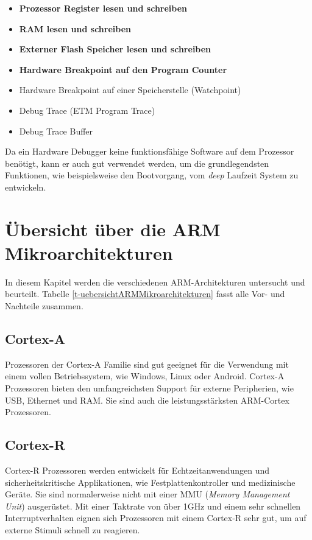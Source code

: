 \begin{itemize}
	\item \textbf{Prozessor Register lesen und schreiben}
	\item \textbf{RAM lesen und schreiben}
	\item \textbf{Externer Flash Speicher lesen und schreiben} 
	\item \textbf{Hardware Breakpoint auf den Program Counter} 
	\item Hardware Breakpoint auf einer Speicherstelle (Watchpoint)
	\item Debug Trace (ETM Program Trace) 
	\item Debug Trace Buffer
\end{itemize}

Da ein Hardware Debugger keine funktionsfähige Software auf dem Prozessor benötigt, kann er auch gut verwendet werden, um die grundlegendsten Funktionen, wie beispielsweise den Bootvorgang, vom \textit{deep} Laufzeit System zu entwickeln.




\section{Übersicht über die ARM Mikroarchitekturen}
In diesem Kapitel werden die verschiedenen ARM-Architekturen untersucht und beurteilt.
Tabelle \ref{t-uebersichtARMMikroarchitekturen} fasst alle Vor- und Nachteile zusammen.

\subsection{Cortex-A}
Prozessoren der Cortex-A Familie sind gut geeignet für die Verwendung mit einem vollen Betriebssystem, wie Windows, Linux oder Android.
Cortex-A Prozessoren bieten den umfangreichsten Support für externe Peripherien, wie USB, Ethernet und RAM.
Sie sind auch die leistungsstärksten ARM-Cortex Prozessoren.

\subsection{Cortex-R}
Cortex-R Prozessoren werden entwickelt für Echtzeitanwendungen und sicherheitskritische Applikationen, wie Festplattenkontroller und medizinische Geräte.
Sie sind normalerweise nicht mit einer MMU (\textit{Memory Management Unit}) ausgerüstet.
Mit einer Taktrate von über 1GHz und einem sehr schnellen Interruptverhalten eignen sich Prozessoren mit einem Cortex-R sehr gut, um auf externe Stimuli schnell zu reagieren.

